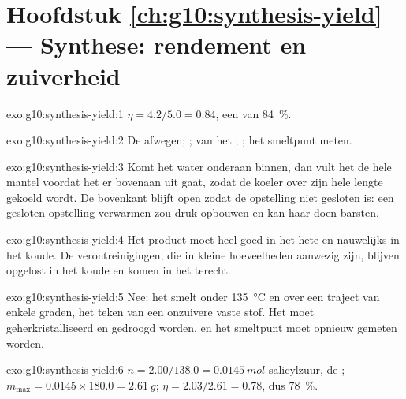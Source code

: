 \section*{Hoofdstuk \ref{ch:g10:synthesis-yield} --- Synthese: rendement en zuiverheid}

\begin{solution}{exo:g10:synthesis-yield:1}
$\eta = 4.2 / 5.0 = 0.84$, een  van \qty{84}{\percent}.
\end{solution}

\begin{solution}{exo:g10:synthesis-yield:2}
De  afwegen; ; 
van het ; ; het smeltpunt meten.
\end{solution}

\begin{solution}{exo:g10:synthesis-yield:3}
Komt het water onderaan binnen, dan vult het de hele mantel voordat het
er bovenaan uit gaat, zodat de koeler over zijn hele lengte gekoeld
wordt. De bovenkant blijft open zodat de opstelling niet gesloten is:
een gesloten opstelling verwarmen zou druk opbouwen en kan haar doen
barsten.
\end{solution}

\begin{solution}{exo:g10:synthesis-yield:4}
Het product moet heel goed  in het hete  en nauwelijks
in het koude. De verontreinigingen, die in kleine hoeveelheden aanwezig
zijn, blijven opgelost in het koude  en komen in het 
terecht.
\end{solution}

\begin{solution}{exo:g10:synthesis-yield:5}
Nee: het smelt onder \qty{135}{\celsius} en over een traject van enkele
graden, het teken van een onzuivere vaste stof. Het moet
geherkristalliseerd en gedroogd worden, en het smeltpunt moet opnieuw
gemeten worden.
\end{solution}

\begin{solution}{exo:g10:synthesis-yield:6}
$n = 2.00 / 138.0 = \qty{0.0145}{mol}$ salicylzuur, de ; $m_{\max} = 0.0145 \times 180.0 = \qty{2.61}{g}$;
$\eta = 2.03 / 2.61 = 0.78$, dus \qty{78}{\percent}.
\end{solution}

